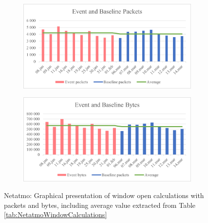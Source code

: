 \begin{figure}[H]
    \centering
    \begin{subfigure}{1\textwidth}
       \centering
       \includegraphics[width=1\hsize]{figures/Netatmo_Window_Calculations_Packets.png} 
    \end{subfigure}
    \begin{subfigure}{1\textwidth}
        \centering
        \includegraphics[width=1\hsize]{figures/Netatmo_Window_Calculations_Bytes.png} 
    \end{subfigure}
    \caption{Netatmo: Graphical presentation of window open calculations with packets and bytes, including average value extracted from Table \ref{tab:NetatmoWindowCalculations}}
    \label{fig:NetatmoWindowCalculations}
\end{figure}

